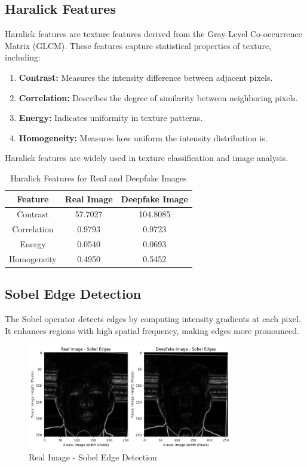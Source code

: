 \documentclass{article}
\begin{document}
\subsection{Haralick Features}
Haralick features are texture features derived from the Gray-Level Co-occurrence Matrix (GLCM). These features capture statistical properties of texture, including:
\begin{enumerate}
    \item \textbf{Contrast:} Measures the intensity difference between adjacent pixels.
    \item \textbf{Correlation:} Describes the degree of similarity between neighboring pixels.
    \item \textbf{Energy:} Indicates uniformity in texture patterns.
    \item \textbf{Homogeneity:} Measures how uniform the intensity distribution is.
\end{enumerate}
Haralick features are widely used in texture classification and image analysis.

\begin{table}[h]
    \centering
    \begin{tabular}{|c|c|c|}
        \hline
        \textbf{Feature} & \textbf{Real Image} & \textbf{Deepfake Image} \\
        \hline
        Contrast & 57.7027 & 104.8085 \\
        Correlation & 0.9793 & 0.9723 \\
        Energy & 0.0540 & 0.0693 \\
        Homogeneity & 0.4950 & 0.5452 \\
        \hline
    \end{tabular}
    \caption{Haralick Features for Real and Deepfake Images}
    \label{tab:haralick_features}
\end{table}

\subsection{Sobel Edge Detection}
The Sobel operator detects edges by computing intensity gradients at each pixel. It enhances regions with high spatial frequency, making edges more pronounced.

\begin{figure}[h!]
    \centering
    \includegraphics[width=0.8\textwidth]{real_sobel.png}
    \caption{Real Image - Sobel Edge Detection}
    \label{fig:real_sobel}
\end{figure}
\end{document}
